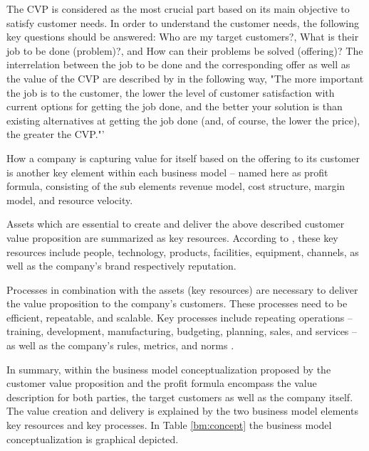 The \ac{CVP} is considered as the most crucial part based on its main objective to satisfy customer needs. In order to understand the customer needs, the following key questions should be answered: Who are my target customers?, What is their job to be done (problem)?, and How can their problems be solved (offering)? The interrelation between the job to be done and the corresponding offer as well as the value of the \ac{CVP} are described by  \citet[p. 52]{Johnson2008} in the following way, "The more important the job is to the customer, the lower the level of customer satisfaction with current options for getting the job done, and the better your solution is than existing alternatives at getting the job done (and, of course, the lower the price), the greater the CVP."'

How a company is capturing value for itself based on the offering to its customer is another key element within each business model -- named here as profit formula, consisting of the sub elements revenue model, cost structure, margin model, and resource velocity.

Assets which are essential to create and deliver the above described customer value proposition are summarized as key resources. According to \citet[p. 53]{Johnson2008}, these key resources include people, technology, products, facilities, equipment, channels, as well as the company's brand respectively reputation.

Processes in combination with the assets (key resources) are necessary to deliver the value proposition to the company's customers. These processes need to be efficient, repeatable, and scalable. Key processes include repeating operations -- training, development, manufacturing, budgeting, planning, sales, and services -- as well as the company's rules, metrics, and norms \citep[p. 53]{Johnson2008}.

In summary, within the business model conceptualization proposed by \citet[p. 54]{Johnson2008} the customer value proposition and the profit formula encompass the value description for both parties, the target customers as well as the company itself. The value creation and delivery is explained by the two business model elements key resources and key processes. In Table \ref{bm:concept} the business model conceptualization is graphical depicted.



